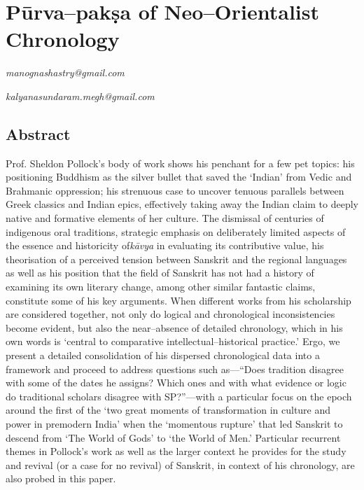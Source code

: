 
\chapter{Pūrva–pakṣa of Neo–Orientalist Chronology}\label{chapter1}



\begin{flushright}
\textit{manognashastry@gmail.com}
\end{flushright}

\begin{flushright}
\textit{kalyanasundaram.megh@gmail.com}
\end{flushright}


\section*{Abstract}

Prof. Sheldon Pollock’s body of work shows his penchant for a few pet topics: his positioning Buddhism as the silver bullet that saved the ‘Indian’ from Vedic and Brahmanic oppression; his strenuous case to uncover tenuous parallels between Greek classics and Indian epics, effectively taking away the Indian claim to deeply native and formative elements of her culture. The dismissal of centuries of indigenous oral traditions, strategic emphasis on deliberately limited aspects of the essence and historicity of\textit{kāvya} in evaluating its contributive value, his theorisation of a perceived tension between Sanskrit and the regional languages as well as his position that the field of Sanskrit has not had a history of examining its own literary change, among other similar fantastic claims, constitute some of his key arguments. When different works from his scholarship are considered together, not only do logical and chronological inconsistencies become evident, but also the near–absence of detailed chronology, which in his own words is ‘central to comparative intellectual–historical practice.’ Ergo, we present a detailed consolidation of his dispersed chronological data into a framework and proceed to address questions such as—“Does tradition disagree with some of the dates he assigns? Which ones and with what evidence or logic do traditional scholars disagree with SP?”—with a particular focus on the epoch around the first of the ‘two great moments of transformation in culture and power in premodern India’ when the ‘momentous rupture’ that led Sanskrit to descend from ‘The World of Gods’ to ‘the World of Men.’ Particular recurrent themes in Pollock’s work as well as the larger context he provides for the study and revival (or a case for no revival) of Sanskrit, in context of his chronology, are also probed in this paper.


